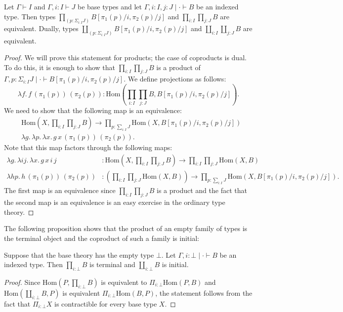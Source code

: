 \documentclass[reqno]{mscs}
\newcommand{\type}{}
\newcommand{\ob}{}
\newcommand{\fs}[1]{\mathrm{#1}}
\newcommand{\Hom}{\fs{Hom}}
\numberwithin{figure}{section}
\begin{document}
\begin{prop}
Let $\Gamma \vdash I \type$ and $\Gamma, i : I \vdash J \type$ be base types and let $\Gamma, i : I, j : J \mid \cdot \vdash B \ob$ be an indexed type.
Then types $\prod_{(p : \Sigma_{i : I} J)} B[\pi_1(p)/i, \pi_2(p)/j]$ and $\prod_{i : I} \prod_{j : J} B$ are equivalent.
Dually, types $\coprod_{(p : \Sigma_{i : I} J)} B[\pi_1(p)/i, \pi_2(p)/j]$ and $\coprod_{i : I} \coprod_{j : J} B$ are equivalent.
\end{prop}
\begin{proof}
We will prove this statement for products; the case of coproducts is dual.
To do this, it is enough to show that $\prod_{i : I} \prod_{j : J} B$ is a product of $\Gamma , p : \Sigma_{i : I} J \mid \cdot \vdash B[\pi_1(p)/i, \pi_2(p)/j] \ob$.
We define projections as follows:
\[ \lambda f.\,f\,(\pi_1(p))\,(\pi_2(p)) : \Hom(\prod_{i : I} \prod_{j : J} B, B[\pi_1(p)/i,\pi_2(p)/j]). \]
We need to show that the following map is an equivalence:
\begin{align*}
& \Hom(X, \prod_{i : I} \prod_{j : J} B) \to \prod_{p : \sum_{i : I} J} \Hom(X, B[\pi_1(p)/i,\pi_2(p)/j]) \\
& \lambda g.\,\lambda p.\,\lambda x.\,g\,x\,(\pi_1(p))\,(\pi_2(p)).
\end{align*}
Note that this map factors through the following maps:
\begin{align*}
\lambda g.\,\lambda i j.\,\lambda x.\,g\,x\,i\,j & : \Hom(X, \prod_{i : I} \prod_{j : J} B) \to \prod_{i : I} \prod_{j : J} \Hom(X,B) \\
\lambda h p.\,h\,(\pi_1(p))\,(\pi_2(p)) & : (\prod_{i : I} \prod_{j : J} \Hom(X,B)) \to \prod_{p : \sum_{i : I} J} \Hom(X, B[\pi_1(p)/i,\pi_2(p)/j]).
\end{align*}
The first map is an equivalence since $\prod_{i : I} \prod_{j : J} B$ is a product and the fact that the second map is an equivalence is an easy exercise in the ordinary type theory.
\end{proof}

The following proposition shows that the product of an empty family of types is the terminal object and the coproduct of such a family is initial:

\begin{prop}
Suppose that the base theory has the empty type $\bot$.
Let $\Gamma, i : \bot \mid \cdot \vdash B \ob$ be an indexed type.
Then $\prod_{i : \bot} B$ is terminal and $\coprod_{i : \bot} B$ is initial.
\end{prop}
\begin{proof}
Since $\Hom(P, \prod_{i : \bot} B)$ is equivalent to $\Pi_{i : \bot} \Hom(P,B)$ and $\Hom(\coprod_{i : \bot} B, P)$ is equivalent $\Pi_{i : \bot} \Hom(B,P)$,
the statement follows from the fact that $\Pi_{i : \bot} X$ is contractible for every base type $X$.
\end{proof}
\end{document}
